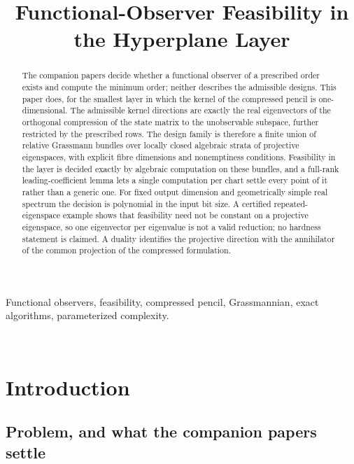 \documentclass[journal]{IEEEtran}
\theoremstyle{plainn}
\theoremstyle{remark}
\begin{document}
\title{Functional-Observer Feasibility in the Hyperplane Layer}
\author{}
\maketitle

\begin{abstract}
The companion papers decide whether a functional observer of a prescribed order exists and compute the
minimum order; neither describes the admissible designs. This paper does, for the smallest layer in
which the kernel of the compressed pencil is one-dimensional. The admissible kernel directions are
exactly the real eigenvectors of the orthogonal compression of the state matrix to the unobservable
subspace, further restricted by the prescribed rows. The design family is therefore a finite union of
relative Grassmann bundles over locally closed algebraic strata of projective eigenspaces, with
explicit fibre dimensions and nonemptiness conditions. Feasibility in the layer is decided exactly by
algebraic computation on these bundles, and a full-rank leading-coefficient lemma lets a single
computation per chart settle every point of it rather than a generic one. For fixed output dimension
and geometrically simple real spectrum the decision is polynomial in the input bit size. A certified
repeated-eigenspace example shows that feasibility need not be constant on a projective eigenspace, so
one eigenvector per eigenvalue is not a valid reduction; no hardness statement is claimed. A duality
identifies the projective direction with the annihilator of the common projection of the compressed
formulation.
\end{abstract}

\begin{IEEEkeywords}
Functional observers, feasibility, compressed pencil, Grassmannian, exact algorithms,
parameterized complexity.
\end{IEEEkeywords}
﻿\section{Introduction}\label{sec:intro}

\subsection{Problem, and what the companion papers settle}\label{sec:intro:problem}
\end{document}

